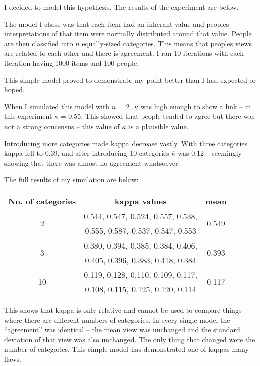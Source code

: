 \documentclass[10pt,\jkfside,a4paper]{article}
\begin{document}
\begin{enumerate}
I decided to model this hypothesis. The results of the experiment are below.

The model I chose was that each item had an inherant value and peoples interpretations of 
that item were normally distributed around that value. People are then classified into $n$ 
equally-sized categories. This means that peoples views are related to each other and there is 
agreement. I ran 10 iterations with each iteration having 1000 items and 100 people.

This simple model proved to demonstrate my point better than I had expected or hoped. 

When I simulated this model with $n$ = 2, $\kappa$ was high enough to show a link -- in this 
experiment $\overline{\kappa}$ = 0.55. 
This showed that people tended to agree but there was not a strong concensus -- this value of 
$\kappa$ is a plausible value.

Introducing more categories made kappa decrease vastly. With three categories kappa fell to 0.39, 
and after introducing 10 categories $\overline{\kappa}$ was 0.12 -- seemingly showing that there was almost no 
agreement whatsoever.

The full results of my simulation are below:

\begin{tabular}{c|c|c}
No. of categories & kappa values & mean \\
\hline
\multirow{2}{*}{2}  & 0.544, 0.547, 0.524, 0.557, 0.538, & \multirow{2}{*}{0.549} \\
				    & 0.555, 0.587, 0.537, 0.547, 0.553 &  \\
\hline
\multirow{2}{*}{3}  & 0.380, 0.394, 0.385, 0.384, 0.406, & \multirow{2}{*}{0.393} \\
				    & 0.405, 0.396, 0.383, 0.418, 0.384 &  \\
\hline
\multirow{2}{*}{10} & 0.119, 0.128, 0.110, 0.109, 0.117, & \multirow{2}{*}{0.117} \\
				    & 0.108, 0.115, 0.125, 0.120, 0.114 &  \\
\end{tabular}

This shows that kappa is only relative and cannot be used to compare things where there are 
different numbers of categories. In every single model the ``agreement'' was identical -- 
the mean view was unchanged and the standard deviation of that view was also unchanged. 
The only thing that changed were the number of categories. This simple model has 
demonstrated one of kappas many flaws.


\end{enumerate}
\end{document}
